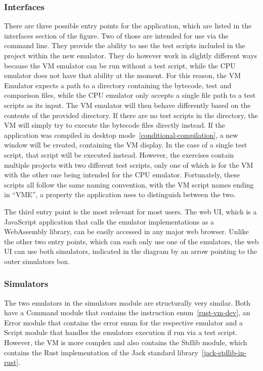 \subsubsection{Interfaces} \label{interfaces}
There are three possible entry points for the application, which are listed in the interfaces section of the figure. Two of those are intended for use via the command line. They provide the ability to use the test scripts included in the project within the new emulator.
They do however work in slightly different ways because the VM emulator can be run without a test script, while the CPU emulator does not have that ability at the moment.
For this reason, the VM Emulator expects a path to a directory containing the bytecode, test and comparison files, while the CPU emulator only accepts a single file path to a test scripts as its input.
The VM emulator will then behave differently based on the contents of the provided directory.
If there are no test scripts in the directory, the VM will simply try to execute the bytecode files directly instead. If the application was compiled in desktop mode~\ref{conditional-compilation}, a new window will be created, containing the VM display.
In the case of a single test script, that script will be executed instead. However, the exercises contain multiple projects with two different test scripts, only one of which is for the VM with the other one being intended for the CPU emulator.
Fortunately, these scripts all follow the same naming convention, with the VM script names ending in ``VME'', a property the application uses to distinguish between the two.

The third entry point is the most relevant for most users. The web UI, which is a JavaScript application that calls the emulator implementations as a WebAssembly library, can be easily accessed in any major web browser.
Unlike the other two entry points, which can each only use one of the emulators, the web UI can use both simulators, indicated in the diagram by an arrow pointing to the outer simulators box.

\subsubsection{Simulators}
The two emulators in the simulators module are structurally very similar. Both have a Command module that contains the instruction enum~\ref{rust-vm-dev}, an Error module that contains the error enum for the respective emulator and a Script module that handles the emulators execution if run via a test script.
However, the VM is more complex and also contains the Stdlib module, which contains the Rust implementation of the Jack standard library~\ref{jack-stdlib-in-rust}.

